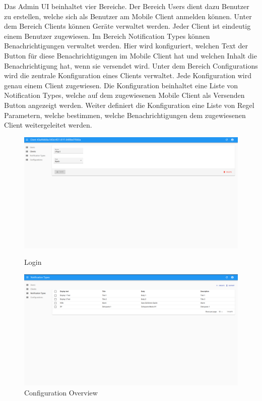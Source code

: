 Das Admin UI beinhaltet vier Bereiche.
Der Bereich Users dient dazu Benutzer zu erstellen, welche sich als Benutzer am Mobile Client anmelden können.
Unter dem Bereich Clients können Geräte verwaltet werden.
Jeder Client ist eindeutig einem Benutzer zugewiesen.
Im Bereich Notification Types können Benachrichtigungen verwaltet werden.
Hier wird konfiguriert, welchen Text der Button für diese Benachrichtigungen im Mobile Client hat und welchen Inhalt die Benachrichtigung hat, wenn sie versendet wird.
Unter dem Bereich Configurations wird die zentrale Konfiguration eines Clients verwaltet.
Jede Konfiguration wird genau einem Client zugewiesen.
Die Konfiguration beinhaltet eine Liste von Notification Types, welche auf dem zugewiesenen Mobile Client als Versenden Button angezeigt werden.
Weiter definiert die Konfiguration eine Liste von Regel Parametern, welche bestimmen, welche Benachrichtigungen dem zugewiesenen Client weitergeleitet werden.

\begin{figure}[h]
    \centering
    \begin{minipage}[b]{0.4\textwidth}
        \includegraphics[width=\textwidth]{graphics/screenshots/adminui/configuration}
        \caption{Login}
    \end{minipage}
    \hfill
    \begin{minipage}[b]{0.4\textwidth}
        \includegraphics[width=\textwidth]{graphics/screenshots/adminui/notification-type}
        \caption{Configuration Overview}
    \end{minipage}
    \label{fig:AdminUI-Screens2}
\end{figure}

